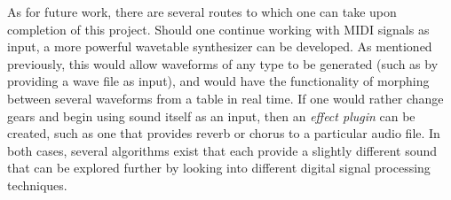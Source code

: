 \documentclass[12pt]{article}
\begin{document}
As for future work, there are several routes to which one can take upon completion of this project. Should one continue working with MIDI signals as input, a more powerful wavetable synthesizer can be developed. As mentioned previously, this would allow waveforms of any type to be generated (such as by providing a wave file as input), and would have the functionality of morphing between several waveforms from a table in real time. If one would rather change gears and begin using sound itself as an input, then an \textit{effect plugin} can be created, such as one that provides reverb or chorus to a particular audio file. In both cases, several algorithms exist that each provide a slightly different sound that can be explored further by looking into different digital signal processing techniques.

\newpage


\end{document}
